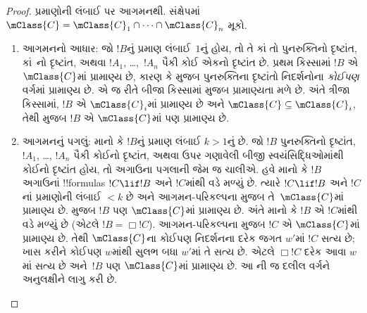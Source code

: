 \documentclass[../../../include/open-logic-section]{subfiles}
\begin{document}
\begin{proof}
  પ્રમાણોની લંબાઈ પર આગમનથી. સંક્ષેપમાં $\mClass{C} =
  \mClass{C}_1 \cap \dots \cap \mClass{C}_n$ મૂકો.
  \begin{enumerate}
  \item આગમનનો આધાર: જો $!B$નું પ્રમાણ લંબાઈ~$1$નું હોય, તો તે
    કાં તો પુનરુક્તિનો દૃષ્ટાંત, કાં~નો દૃષ્ટાંત, અથવા $!A_1$, \dots,~$!A_n$ પૈકી કોઈ
    એકનો દૃષ્ટાંત છે. પ્રથમ કિસ્સામાં $!B$ એ $\mClass{C}$માં
    પ્રામાણ્ય છે, કારણ કે  મુજબ
    પુનરુક્તિના દૃષ્ટાંતો નિદર્શનોના \emph{કોઈપણ} વર્ગમાં પ્રામાણ્ય છે.
    એ જ રીતે બીજા કિસ્સામાં
     મુજબ પ્રામાણ્યતા મળે છે.
    અંતે ત્રીજા કિસ્સામાં, $!B$ એ $\mClass{C}_i$માં પ્રામાણ્ય છે અને
    $\mClass{C} \subseteq \mClass{C}_i$, તેથી
     મુજબ $!B$ એ $\mClass{C}$માં
    પણ પ્રામાણ્ય છે.
  \item આગમનનું પગલું: માનો કે $!B$નું પ્રમાણ લંબાઈ $k>1$નું છે. જો
    $!B$ પુનરુક્તિનો દૃષ્ટાંત, $!A_1$, \dots, $!A_n$ પૈકી કોઈનો
    દૃષ્ટાંત, અથવા ઉપર ગણાવેલી બીજી સ્વયંસિદ્ધિઓમાંથી કોઈનો દૃષ્ટાંત
    હોય, તો અગાઉના પગલાની જેમ જ ચાલીએ.
    હવે માનો કે $!B$ અગાઉનાં !!{formula}s $!C \lif !B$ અને $!C$માંથી
    \MP{} વડે મળ્યું છે. ત્યારે $!C \lif !B$ અને $!C$નાં પ્રમાણોની
    લંબાઈ $<k$ છે અને આગમન-પરિકલ્પના મુજબ તે~$\mClass{C}$માં પ્રામાણ્ય
    છે.  મુજબ $!B$ પણ
    $\mClass{C}$માં પ્રામાણ્ય છે. અંતે માનો કે $!B$ એ $!C$માંથી
    \Nec{} વડે મળ્યું છે (એટલે $!B = \Box!C$). આગમન-પરિકલ્પના મુજબ
    $!C$ એ $\mClass{C}$માં પ્રામાણ્ય છે. તેથી
    $\mClass{C}$ના કોઈપણ નિદર્શનના દરેક જગત $w'$માં
    $!C$ સત્ય છે; ખાસ કરીને કોઈપણ $w$માંથી સુલભ બધા
    $w'$માં તે સત્ય છે. એટલે $\Box !C$ દરેક આવા $w$માં સત્ય છે
    અને~$!B$ પણ $\mClass{C}$માં પ્રામાણ્ય છે.
    આ ની જ દલીલ વર્ગને
    અનુલક્ષીને લાગુ કરી છે.
  \end{enumerate}
\end{proof}
\end{document}
